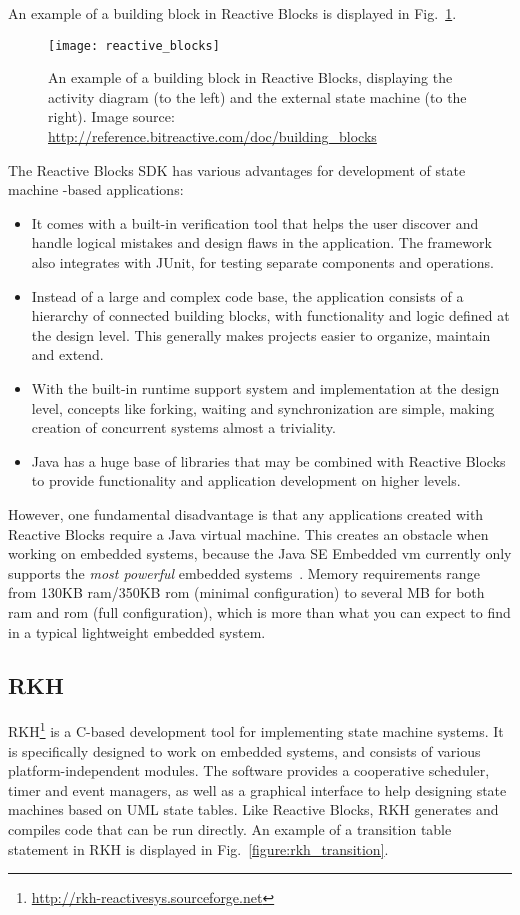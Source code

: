 An example of a building block in Reactive Blocks is displayed in Fig.~\ref{figure:reactive_blocks}.

\begin{figure}[htp]
	\centering
	\texttt{[image: reactive\_blocks]}
	\caption[A building block in Reactive Blocks]{An example of a building block in Reactive Blocks, displaying the activity diagram (to the left) and the external state machine (to the right). Image source: \url{http://reference.bitreactive.com/doc/building_blocks}}
	\label{figure:reactive_blocks}
\end{figure}

The Reactive Blocks SDK has various advantages for development of state machine -based applications:
\begin{itemize}
	\item It comes with a built-in verification tool that helps the user discover and handle logical mistakes and design flaws in the application. The framework also integrates with JUnit, for testing separate components and operations.
	\item Instead of a large and complex code base, the application consists of a hierarchy of connected building blocks, with functionality and logic defined at the design level. This generally makes projects easier to organize, maintain and extend.
	\item With the built-in runtime support system and implementation at the design level, concepts like forking, waiting and synchronization are simple, making creation of concurrent systems almost a triviality.
	\item Java has a huge base of libraries that may be combined with Reactive Blocks to provide functionality and application development on higher levels.
\end{itemize}

However, one fundamental disadvantage is that any applications created with Reactive Blocks require a Java virtual machine. This creates an obstacle when working on embedded systems, because the Java SE Embedded \gls{vm} currently only supports the \emph{most powerful} embedded systems~\cite{website:java_embedded_vm}. Memory requirements range from 130KB \gls{ram}/350KB \gls{rom} (minimal configuration) to several MB for both \gls{ram} and \gls{rom} (full configuration), which is more than what you can expect to find in a typical lightweight embedded system.

\subsection{RKH}
\label{sec:rkh_state_machine}
RKH\footnote{\url{http://rkh-reactivesys.sourceforge.net}} is a C-based development tool for implementing state machine systems. It is specifically designed to work on embedded systems, and consists of various platform-independent modules. The software provides a cooperative scheduler, timer and event managers, as well as a graphical interface to help designing state machines based on UML state tables. Like Reactive Blocks, RKH generates and compiles code that can be run directly. An example of a transition table statement in RKH is displayed in Fig.~\ref{figure:rkh_transition}.

